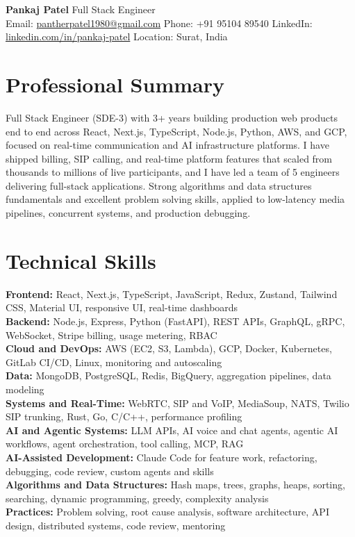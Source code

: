 \documentclass[9pt,a4paper]{extarticle}
\newcommand{\skillrow}[2]{\textbf{#1:} #2 \\[3.0pt]}
\begin{document}
\begin{center}
  \RaggedRight\centering
  {\LARGE\bfseries\color{accent} Pankaj Patel}\enspace{\color{muted}\textbar}\enspace
  {\large Full Stack Engineer}\\[4pt]
  {\small
    Email: \href{mailto:pantherpatel1980@gmail.com}{pantherpatel1980@gmail.com}\enspace{\color{muted}\textbar}\enspace
    Phone: +91 95104 89540\enspace{\color{muted}\textbar}\enspace
    LinkedIn: \href{https://www.linkedin.com/in/pankaj-patel-72332b228}{linkedin.com/in/pankaj-patel}\enspace{\color{muted}\textbar}\enspace
    Location: Surat, India
  }
\end{center}
\vspace{1mm}

\section{Professional Summary}
Full Stack Engineer (SDE-3) with 3+ years building production web products end to end across React, Next.js, TypeScript,
Node.js, Python, AWS, and GCP, focused on real-time communication and AI infrastructure platforms. I have shipped billing,
SIP calling, and real-time platform features that scaled from thousands to millions of live participants, and I have led a team
of 5 engineers delivering full-stack applications. Strong algorithms and data structures fundamentals and excellent problem
solving skills, applied to low-latency media pipelines, concurrent systems, and production debugging.

\section{Technical Skills}
\skillrow{Frontend}{React, Next.js, TypeScript, JavaScript, Redux, Zustand, Tailwind CSS, Material UI, responsive UI, real-time dashboards}
\skillrow{Backend}{Node.js, Express, Python (FastAPI), REST APIs, GraphQL, gRPC, WebSocket, Stripe billing, usage metering, RBAC}
\skillrow{Cloud and DevOps}{AWS (EC2, S3, Lambda), GCP, Docker, Kubernetes, GitLab CI/CD, Linux, monitoring and autoscaling}
\skillrow{Data}{MongoDB, PostgreSQL, Redis, BigQuery, aggregation pipelines, data modeling}
\skillrow{Systems and Real-Time}{WebRTC, SIP and VoIP, MediaSoup, NATS, Twilio SIP trunking, Rust, Go, C/C++, performance prof\/iling}
\skillrow{AI and Agentic Systems}{LLM APIs, AI voice and chat agents, agentic AI workf\/lows, agent orchestration, tool calling, MCP, RAG}
\skillrow{AI-Assisted Development}{Claude Code for feature work, refactoring, debugging, code review, custom agents and skills}
\skillrow{Algorithms and Data Structures}{Hash maps, trees, graphs, heaps, sorting, searching, dynamic programming, greedy, complexity analysis}
\skillrow{Practices}{Problem solving, root cause analysis, software architecture, API design, distributed systems, code review, mentoring}
\end{document}
